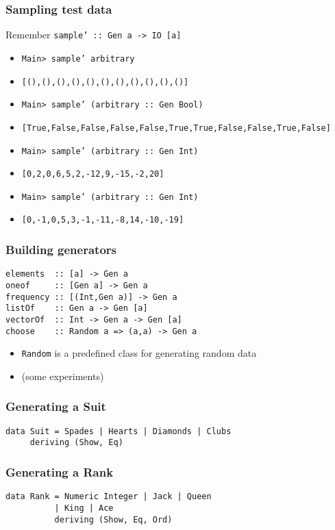 \documentclass{beamer}
\begin{document}
\begin{frame}[fragile]
  \frametitle{Sampling test data}
  Remember \texttt{sample'  :: Gen a -> IO [a]}
  \footnotesize
  \begin{itemize}[<+->]
  \item \texttt{Main> sample' arbitrary}
  \item \texttt{[(),(),(),(),(),(),(),(),(),(),()]}
  \item \texttt{Main> sample' (arbitrary :: Gen Bool)}
  \item \texttt{[True,False,False,False,False,True,True,False,False,True,False]}
  \item \texttt{Main> sample' (arbitrary :: Gen Int)}
  \item \texttt{[0,2,0,6,5,2,-12,9,-15,-2,20]}
  \item \texttt{Main> sample' (arbitrary :: Gen Int)}
  \item \texttt{[0,-1,0,5,3,-1,-11,-8,14,-10,-19]}
  \end{itemize}
\end{frame}
\begin{frame}[fragile]
  \frametitle{Building generators}
\begin{verbatim}
elements  :: [a] -> Gen a
oneof     :: [Gen a] -> Gen a
frequency :: [(Int,Gen a)] -> Gen a
listOf    :: Gen a -> Gen [a]
vectorOf  :: Int -> Gen a -> Gen [a]
choose    :: Random a => (a,a) -> Gen a
\end{verbatim}
  \begin{itemize}
  \item \texttt{Random} is a predefined class for generating random data
  \item (some experiments)
  \end{itemize}
\end{frame}
\begin{frame}[fragile]
  \frametitle{Generating a Suit}
\begin{verbatim}
data Suit = Spades | Hearts | Diamonds | Clubs
     deriving (Show, Eq)
\end{verbatim}
\end{frame}
\begin{frame}[fragile]
  \frametitle{Generating a Rank}
\begin{verbatim}
data Rank = Numeric Integer | Jack | Queen
          | King | Ace
          deriving (Show, Eq, Ord)
\end{verbatim}
\end{frame}
\end{document}

